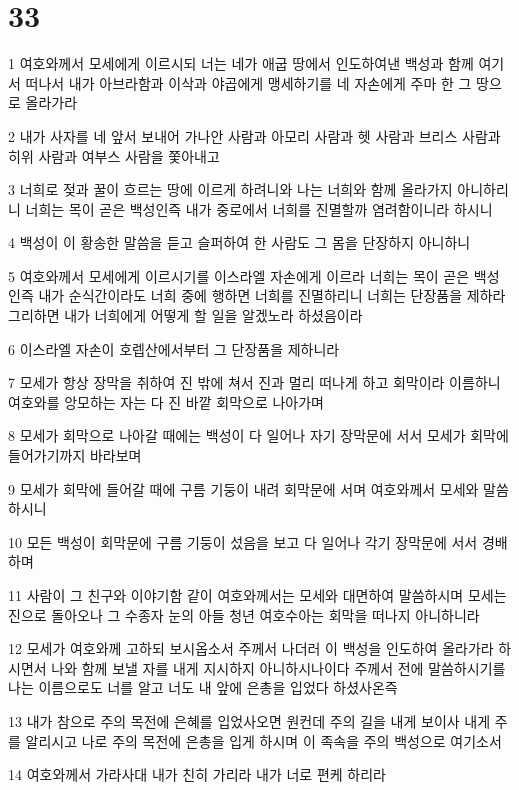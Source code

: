 \chapter{33}

\par 1 여호와께서 모세에게 이르시되 너는 네가 애굽 땅에서 인도하여낸 백성과 함께 여기서 떠나서 내가 아브라함과 이삭과 야곱에게 맹세하기를 네 자손에게 주마 한 그 땅으로 올라가라
\par 2 내가 사자를 네 앞서 보내어 가나안 사람과 아모리 사람과 헷 사람과 브리스 사람과 히위 사람과 여부스 사람을 쫓아내고
\par 3 너희로 젖과 꿀이 흐르는 땅에 이르게 하려니와 나는 너희와 함께 올라가지 아니하리니 너희는 목이 곧은 백성인즉 내가 중로에서 너희를 진멸할까 염려함이니라 하시니
\par 4 백성이 이 황송한 말씀을 듣고 슬퍼하여 한 사람도 그 몸을 단장하지 아니하니
\par 5 여호와께서 모세에게 이르시기를 이스라엘 자손에게 이르라 너희는 목이 곧은 백성인즉 내가 순식간이라도 너희 중에 행하면 너희를 진멸하리니 너희는 단장품을 제하라 그리하면 내가 너희에게 어떻게 할 일을 알겠노라 하셨음이라
\par 6 이스라엘 자손이 호렙산에서부터 그 단장품을 제하니라
\par 7 모세가 항상 장막을 취하여 진 밖에 쳐서 진과 멀리 떠나게 하고 회막이라 이름하니 여호와를 앙모하는 자는 다 진 바깥 회막으로 나아가며
\par 8 모세가 회막으로 나아갈 때에는 백성이 다 일어나 자기 장막문에 서서 모세가 회막에 들어가기까지 바라보며
\par 9 모세가 회막에 들어갈 때에 구름 기둥이 내려 회막문에 서며 여호와께서 모세와 말씀하시니
\par 10 모든 백성이 회막문에 구름 기둥이 섰음을 보고 다 일어나 각기 장막문에 서서 경배하며
\par 11 사람이 그 친구와 이야기함 같이 여호와께서는 모세와 대면하여 말씀하시며 모세는 진으로 돌아오나 그 수종자 눈의 아들 청년 여호수아는 회막을 떠나지 아니하니라
\par 12 모세가 여호와께 고하되 보시옵소서 주께서 나더러 이 백성을 인도하여 올라가라 하시면서 나와 함께 보낼 자를 내게 지시하지 아니하시나이다 주께서 전에 말씀하시기를 나는 이름으로도 너를 알고 너도 내 앞에 은총을 입었다 하셨사온즉
\par 13 내가 참으로 주의 목전에 은혜를 입었사오면 원컨데 주의 길을 내게 보이사 내게 주를 알리시고 나로 주의 목전에 은총을 입게 하시며 이 족속을 주의 백성으로 여기소서
\par 14 여호와께서 가라사대 내가 친히 가리라 내가 너로 편케 하리라
